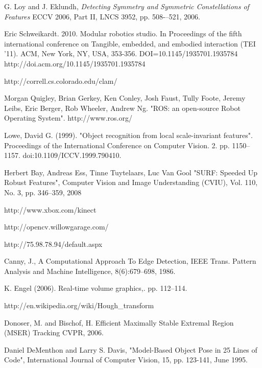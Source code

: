 \documentclass[conference]{IEEEtran}
\begin{document}
%
%
%
\begin{thebibliography}{1}


G. Loy and J. Eklundh, \emph{Detecting Symmetry and Symmetric Constellations of Features}
\relax ECCV 2006, Part II, LNCS 3952, pp. 508-–521, 2006.


Eric Schweikardt. 2010. Modular robotics studio. In Proceedings of the fifth international conference on Tangible, embedded, and embodied interaction (TEI '11). ACM, New York, NY, USA, 353-356. DOI=10.1145/1935701.1935784 http://doi.acm.org/10.1145/1935701.1935784

http://correll.cs.colorado.edu/clam/

Morgan Quigley, Brian Gerkey, Ken Conley, Josh Faust, Tully Foote, Jeremy Leibs, Eric Berger, Rob Wheeler, Andrew Ng. "ROS: an open-source Robot Operating System". http://www.ros.org/

Lowe, David G. (1999). "Object recognition from local scale-invariant features". Proceedings of the International Conference on Computer 
Vision. 2. pp. 1150–1157. doi:10.1109/ICCV.1999.790410.

Herbert Bay, Andreas Ess, Tinne Tuytelaars, Luc Van Gool "SURF: Speeded Up Robust Features", Computer Vision and Image Understanding (CVIU), Vol. 110, No. 3, pp. 346--359, 2008

http://www.xbox.com/kinect

http://opencv.willowgarage.com/

http://75.98.78.94/default.aspx

Canny, J., A Computational Approach To Edge Detection, IEEE Trans. Pattern Analysis and Machine Intelligence, 8(6):679–698, 1986.

K. Engel (2006). Real-time volume graphics,. pp. 112–114.

http://en.wikipedia.org/wiki/Hough\_transform

\cite{MSER}
Donoser, M. and Bischof, H. Efficient Maximally Stable Extremal Region (MSER) Tracking CVPR, 2006.

Daniel DeMenthon and Larry S. Davis, "Model-Based Object Pose in 25 Lines of Code", International Journal of Computer Vision, 15, pp. 123-141, June 1995.
\end{thebibliography}




\end{document}
